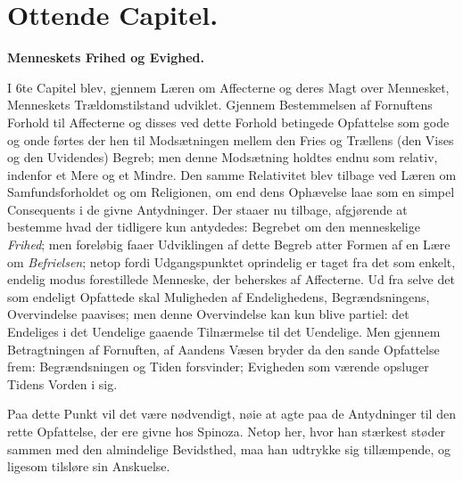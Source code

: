 \documentclass[12pt,a4paper]{book}
\newcommand{\opage}[1]{\marginnote{\footnotesize\textit{[#1]}}}
\begin{document}
\newpage

\chapter*{Ottende Capitel.}

\begin{center}
\textbf{Menneskets Frihed og Evighed.}
\end{center}

\opage{162} I 6te Capitel blev, gjennem Læren om Affecterne og
deres Magt over Mennesket, Menneskets Trældomstilstand
udviklet. Gjennem Bestemmelsen af Fornuftens Forhold til
Affecterne og disses ved dette Forhold betingede Opfattelse
som gode og onde førtes der hen til Modsætningen mellem
den Fries og Trællens (den Vises og den Uvidendes) Begreb;
men denne Modsætning holdtes endnu som relativ, indenfor
et Mere og et Mindre. Den samme Relativitet blev tilbage
ved Læren om Samfundsforholdet og om Religionen, om end
dens Ophævelse laae som en simpel Consequents i de givne
Antydninger. Der staaer nu tilbage, afgjørende at bestemme
hvad der tidligere kun antydedes: Begrebet om den menneskelige
\emph{Frihed}; men foreløbig faaer Udviklingen af dette Begreb
atter Formen af en Lære om \emph{Befrielsen}; netop fordi Udgangspunktet
oprindelig er taget fra det som enkelt, endelig modus
forestillede Menneske, der beherskes af Affecterne. Ud fra
selve det som endeligt Opfattede skal Muligheden af Endelighedens,
Begrændsningens, Overvindelse paavises; men denne
Overvindelse kan kun blive partiel: det Endeliges i det
Uendelige gaaende Tilnærmelse til det Uendelige. Men gjennem
Betragtningen af Fornuften, af Aandens Væsen bryder da
den sande Opfattelse frem: Begrændsningen%
 og Tiden forsvinder; Evigheden som værende opsluger Tidens Vorden i sig.

Paa dette Punkt vil det være nødvendigt, nøie at agte
paa de Antydninger til den rette Opfattelse, der ere givne
hos Spinoza. Netop her, hvor han stærkest støder sammen
med den almindelige Bevidsthed, maa han udtrykke sig tillæmpende,
og ligesom tilsløre sin Anskuelse.
\end{document}
